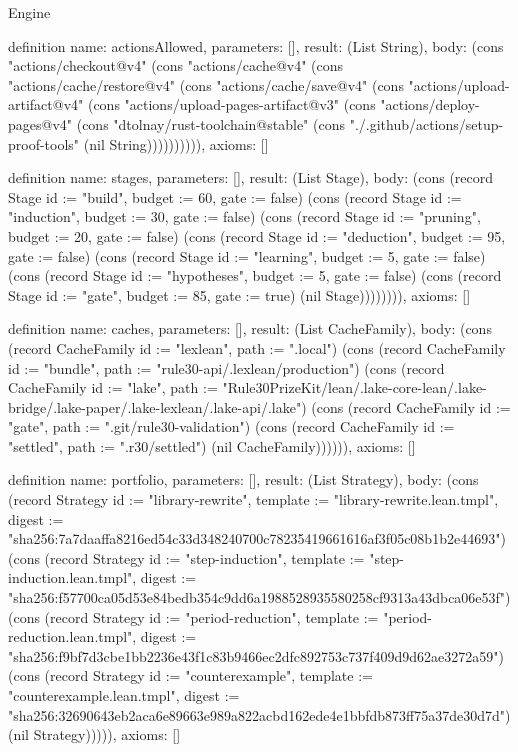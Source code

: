 \begin{lexlean}{Engine}
\begin{semanticmodule}
definition{
  name: actionsAllowed,
  parameters: [],
  result: (List String),
  body: (cons "actions/checkout@v4" (cons "actions/cache@v4" (cons "actions/cache/restore@v4" (cons "actions/cache/save@v4" (cons "actions/upload-artifact@v4" (cons "actions/upload-pages-artifact@v3" (cons "actions/deploy-pages@v4" (cons "dtolnay/rust-toolchain@stable" (cons "./.github/actions/setup-proof-tools" (nil String)))))))))),
  axioms: []
}

definition{
  name: stages,
  parameters: [],
  result: (List Stage),
  body: (cons (record Stage {id := "build", budget := 60, gate := false}) (cons (record Stage {id := "induction", budget := 30, gate := false}) (cons (record Stage {id := "pruning", budget := 20, gate := false}) (cons (record Stage {id := "deduction", budget := 95, gate := false}) (cons (record Stage {id := "learning", budget := 5, gate := false}) (cons (record Stage {id := "hypotheses", budget := 5, gate := false}) (cons (record Stage {id := "gate", budget := 85, gate := true}) (nil Stage)))))))),
  axioms: []
}

definition{
  name: caches,
  parameters: [],
  result: (List CacheFamily),
  body: (cons (record CacheFamily {id := "lexlean", path := ".local"}) (cons (record CacheFamily {id := "bundle", path := "rule30-api/.lexlean/production"}) (cons (record CacheFamily {id := "lake", path := "Rule30PrizeKit/lean/.lake-core-lean/.lake-bridge/.lake-paper/.lake-lexlean/.lake-api/.lake"}) (cons (record CacheFamily {id := "gate", path := ".git/rule30-validation"}) (cons (record CacheFamily {id := "settled", path := ".r30/settled"}) (nil CacheFamily)))))),
  axioms: []
}

definition{
  name: portfolio,
  parameters: [],
  result: (List Strategy),
  body: (cons (record Strategy {id := "library-rewrite", template := "library-rewrite.lean.tmpl", digest := "sha256:7a7daaffa8216ed54c33d348240700c78235419661616af3f05c08b1b2e44693"}) (cons (record Strategy {id := "step-induction", template := "step-induction.lean.tmpl", digest := "sha256:f57700ca05d53e84bedb354c9dd6a1988528935580258cf9313a43dbca06e53f"}) (cons (record Strategy {id := "period-reduction", template := "period-reduction.lean.tmpl", digest := "sha256:f9bf7d3cbe1bb2236e43f1c83b9466ec2dfc892753c737f409d9d62ae3272a59"}) (cons (record Strategy {id := "counterexample", template := "counterexample.lean.tmpl", digest := "sha256:32690643eb2aca6e89663e989a822acbd162ede4e1bbfdb873ff75a37de30d7d"}) (nil Strategy))))),
  axioms: []
}


\end{semanticmodule}
\end{lexlean}
